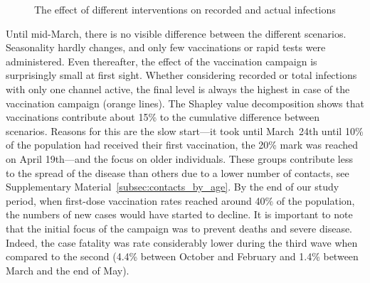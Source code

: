 \begin{figure}[!tp]
    \caption{The effect of different interventions on recorded and actual infections}
    \label{fig:2021_scenarios_broad}

\end{figure}

Until mid-March, there is no visible difference between the different scenarios.
Seasonality hardly changes, and only few vaccinations or rapid tests were administered.
Even thereafter, the effect of the vaccination campaign is surprisingly small at first
sight. Whether considering recorded or total infections with only one channel active,
the final level is always the highest in case of the vaccination campaign (orange
lines). The Shapley value decomposition shows that vaccinations contribute about 15\% to
the cumulative difference between scenarios. Reasons for this are the slow start---it
took until March~24th until 10\% of the population had received their first vaccination,
the 20\% mark was reached on April 19th---and the focus on older individuals. These
groups contribute less to the spread of the disease than others due to a lower number of
contacts, see Supplementary Material~\ref{subsec:contacts_by_age}. By the end of our
study period, when first-dose vaccination rates reached around 40\% of the population,
the numbers of new cases would have started to decline. It is important to note that the
initial focus of the campaign was to prevent deaths and severe disease. Indeed, the case
fatality was rate considerably lower during the third wave when compared to the second
(4.4\% between October and February and 1.4\% between March and the end of May).

